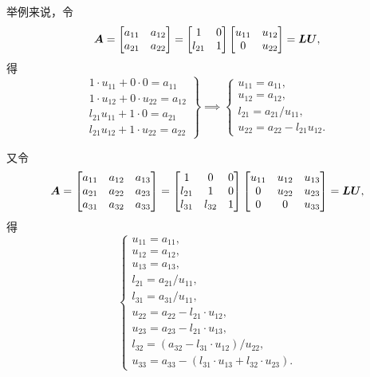 举例来说，令\[
	\boldsymbol{A} = \begin{bmatrix}
		a_{11} & a_{12} \\
		a_{21} & a_{22}
	\end{bmatrix}
	= \begin{bmatrix}
		1 & 0 \\
		l_{21} & 1
	\end{bmatrix}
	\begin{bmatrix}
		u_{11} & u_{12} \\
		0 & u_{22}
	\end{bmatrix}
	= \boldsymbol{L} \boldsymbol{U},
\]
得\[
	\left.\begin{array}{r}
		1 \cdot u_{11} + 0 \cdot 0 = a_{11} \\
		1 \cdot u_{12} + 0 \cdot u_{22} = a_{12} \\
		l_{21} u_{11} + 1 \cdot 0 = a_{21} \\
		l_{21} u_{12} + 1 \cdot u_{22} = a_{22}
	\end{array}\right\}
	\implies
	\left\{\begin{array}{l}
		u_{11} = a_{11}, \\
		u_{12} = a_{12}, \\
		l_{21} = a_{21} / u_{11}, \\
		u_{22} = a_{22} - l_{21} u_{12}.
	\end{array}\right.
\]

又令\[
	\boldsymbol{A} = \begin{bmatrix}
		a_{11} & a_{12} & a_{13} \\
		a_{21} & a_{22} & a_{23} \\
		a_{31} & a_{32} & a_{33}
	\end{bmatrix}
	= \begin{bmatrix}
		1 & 0 & 0 \\
		l_{21} & 1 & 0 \\
		l_{31} & l_{32} & 1
	\end{bmatrix}
	\begin{bmatrix}
		u_{11} & u_{12} & u_{13} \\
		0 & u_{22} & u_{23} \\
		0 & 0 & u_{33}
	\end{bmatrix} = \boldsymbol{L} \boldsymbol{U},
\]
得\[
	\left\{\begin{array}{l}
		u_{11} = a_{11}, \\
		u_{12} = a_{12}, \\
		u_{13} = a_{13}, \\
		l_{21} = a_{21} / u_{11}, \\
		l_{31} = a_{31} / u_{11}, \\
		u_{22} = a_{22} - l_{21} \cdot u_{12}, \\
		u_{23} = a_{23} - l_{21} \cdot u_{13}, \\
		l_{32} = (a_{32} - l_{31} \cdot u_{12}) / u_{22}, \\
		u_{33} = a_{33} - (l_{31} \cdot u_{13} + l_{32} \cdot u_{23}).
	\end{array}\right.
\]


